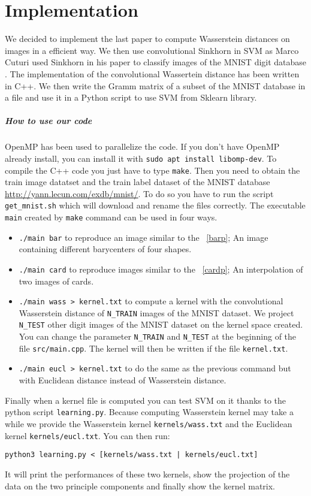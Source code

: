 \chapter{Implementation}

We decided to implement the last paper to compute Wasserstein distances on images in a efficient way. We then use convolutional Sinkhorn in SVM as Marco Cuturi used Sinkhorn in his paper to classify images of the MNIST digit database \cite{Cut}. The implementation of the convolutional Wassertein distance has been written in C++. We then write the Gramm matrix of a subset of the MNIST database in a file and use it in a Python script to use SVM from Sklearn library.

\paragraph{How to use our code}
OpenMP has been used to parallelize the code. If you don't have OpenMP already install, you can install it with \verb|sudo apt install libomp-dev|.
To compile the C++ code you just have to type \verb|make|. Then you need to obtain the train image datatset and the train label dataset of the MNIST database \url{http://yann.lecun.com/exdb/mnist/}. To do so you have to run the script \verb|get_mnist.sh| which will download and rename the files correctly. The executable \verb|main| created by \verb|make| command can be used in four ways.
\begin{itemize}
	\item  \verb|./main bar| to reproduce an image similar to the \figurename~\ref{barp}; An image containing different barycenters of four shapes.
	\item \verb|./main card| to reproduce images similar to the \figurename~\ref{cardp}; An interpolation of two images of cards.
	\item \verb|./main wass > kernel.txt| to compute a kernel with the convolutional Wasserstein distance of \verb|N_TRAIN| images of the MNIST dataset. We project \verb|N_TEST| other digit images of the MNIST dataset on the kernel space created. You can change the parameter \verb|N_TRAIN| and \verb|N_TEST| at the beginning of the file \verb|src/main.cpp|. The kernel will then be written if the file \verb|kernel.txt|.
	\item \verb|./main eucl > kernel.txt| to do the same as the previous command but with Euclidean distance instead of Wasserstein distance. 
\end{itemize}
Finally when a kernel file is computed you can test SVM on it thanks to the python script \verb|learning.py|. Because computing Wasserstein kernel may take a while we provide the Wasserstein kernel \verb|kernels/wass.txt| and the Euclidean kernel \verb|kernels/eucl.txt|. You can then run:
\begin{center}
	\verb=python3 learning.py < [kernels/wass.txt | kernels/eucl.txt]=
\end{center}
It will print the performances of these two kernels, show the projection of the data on the two principle components and finally show the kernel matrix.


